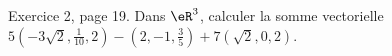 \begin{exercice}\label{exoLineraire0014}

	Exercice 2, page 19. Dans $\eR^3$, calculer la somme vectorielle $5(-3\sqrt{2},\frac{1}{ 10 },2)-(2,-1,\frac{ 3 }{ 5 })+7(\sqrt{2},0,2)$.

\end{exercice}
